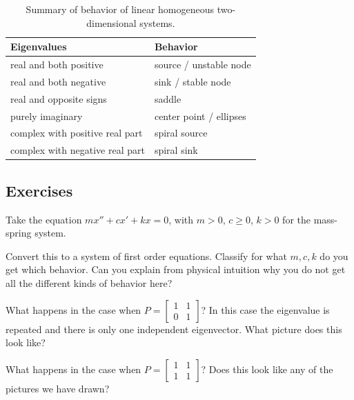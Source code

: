\begin{table}[h!t]
\mybeginframe
\capstart
\begin{center}
\begin{tabular}{@{}ll@{}}
\toprule
Eigenvalues & Behavior \\
\midrule
real and both positive & source / unstable node \\
real and both negative & sink / stable node \\
real and opposite signs & saddle \\
purely imaginary & center point / ellipses \\
complex with positive real part & spiral source \\
complex with negative real part & spiral sink \\
\bottomrule
\end{tabular}
\end{center}
\caption{Summary of behavior of linear homogeneous two-dimensional systems.\label{pln:behtab}}
\myendframe
\end{table}

\subsection{Exercises}

\begin{exercise}
Take the equation $m x'' + c x' + kx = 0$, with $m > 0$, $c \geq 0$, $k > 0$
for the mass-spring system.
\begin{tasks}
\task Convert this to a system of first
order equations.
\task Classify for what $m, c, k$ do you get which behavior.
\task Can you explain from physical intuition why you do not get all the
different kinds of behavior here?
\end{tasks}
\end{exercise}

\begin{exercise}
What happens in the case when $P = 
\left[ \begin{smallmatrix} 1 & 1 \\ 0 & 1 \end{smallmatrix} \right]$?  In
this case the eigenvalue is repeated and there is only one independent eigenvector.
What
picture does this look like?
\end{exercise}

\begin{exercise}
What happens in the case when $P = 
\left[ \begin{smallmatrix} 1 & 1 \\ 1 & 1 \end{smallmatrix} \right]$?
Does this look like any of the pictures we have drawn?
\end{exercise}

